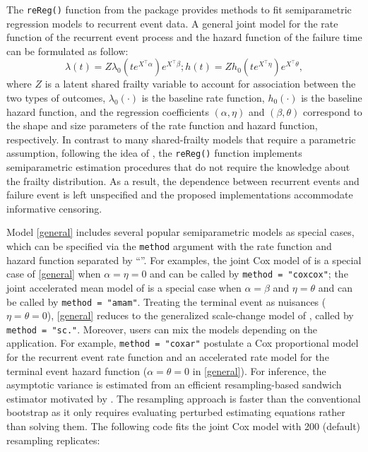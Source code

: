The \texttt{reReg()} function from the  package provides
methods to fit semiparametric regression models to recurrent event data.
A general joint model for the rate function of the recurrent event
process and the hazard function of the failure time can be formulated as
follow: \begin{equation}
\lambda(t) = Z \lambda_0(te^{X^\top\alpha})e^{X^\top\beta};
h(t) = Z h_0(te^{X^\top\eta})e^{X^\top\theta},\label{general}
\end{equation} where \(Z\) is a latent shared frailty variable to
account for association between the two types of outcomes,
\(\lambda_0(\cdot)\) is the baseline rate function, \(h_0(\cdot)\) is
the baseline hazard function, and the regression coefficients
\((\alpha, \eta)\) and \((\beta, \theta)\) correspond to the shape and
size parameters of the rate function and hazard function, respectively.
In contrast to many shared-frailty models that require a parametric
assumption, following the idea of \citet{wang2001analyzing}, the
\texttt{reReg()} function implements semiparametric estimation
procedures that do not require the knowledge about the frailty
distribution. As a result, the dependence between recurrent events and
failure event is left unspecified and the proposed implementations
accommodate informative censoring.

Model \eqref{general} includes several popular semiparametric models as
special cases, which can be specified via the \texttt{method} argument
with the rate function and hazard function separated by
``\texttt{\textbar{}}''. For examples, the joint Cox model of
\citet{huang2004joint} is a special case of \eqref{general} when
\(\alpha = \eta = 0\) and can be called by
\texttt{method\ =\ "cox\textbar{}cox"}; the joint accelerated mean model
of \citet{xu2017joint} is a special case when \(\alpha = \beta\) and
\(\eta = \theta\) and can be called by
\texttt{method\ =\ "am\textbar{}am"}. Treating the terminal event as
nuisances (\(\eta = \theta = 0\)), \eqref{general} reduces to the
generalized scale-change model of \citet{xu2019generalized}, called by
\texttt{method\ =\ "sc\textbar{}."}. Moreover, users can mix the models
depending on the application. For example,
\texttt{method\ =\ "cox\textbar{}ar"} postulate a Cox proportional model
for the recurrent event rate function and an accelerated rate model for
the terminal event hazard function (\(\alpha = \theta = 0\) in
\eqref{general}). For inference, the asymptotic variance is estimated
from an efficient resampling-based sandwich estimator motivated by
\citet{zeng2008efficient}. The resampling approach is faster than the
conventional bootstrap as it only requires evaluating perturbed
estimating equations rather than solving them. The following code fits
the joint Cox model with 200 (default) resampling replicates:


